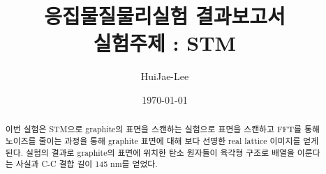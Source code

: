 \documentclass[aps,reprint,superscriptaddress,11pt]{revtex4-2}
\begin{document}
\title{응집물질물리실험 결과보고서 \\
\small 실험주제 : STM}

\author{HuiJae-Lee}

\date{\today}


\begin{abstract}
  이번 실험은 STM으로 graphite의 표면을 스캔하는 실험으로 표면을 스캔하고 FFT를 통해
  노이즈를 줄이는 과정을 통해 graphite 표면에 대해 보다 선명한 real lattice 이미지를 얻게 된다.
  실험의 결과로 graphite의 표면에 위치한 탄소 원자들이 육각형 구조로 배열을 이룬다는 사실과
  C-C 결합 길이 145 nm를 얻었다.
\end{abstract}

\maketitle

\end{document}
